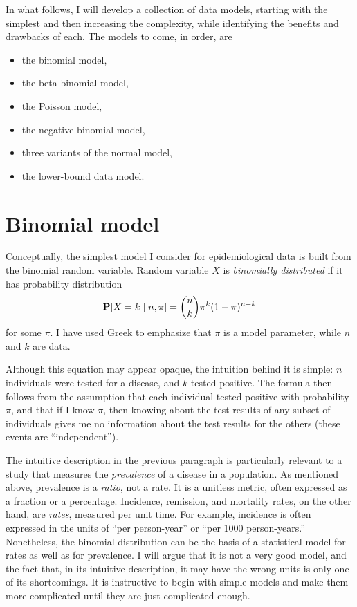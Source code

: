 In what follows, I will develop a collection of data models, starting
with the simplest and then increasing the complexity, while
identifying the benefits and drawbacks of each.  The models to come,
in order, are
\begin{itemize}
\item the binomial model,
\item the beta-binomial model,
\item the Poisson model,
\item the negative-binomial model,
\item three variants of the normal model,
\item the lower-bound data model.
\end{itemize}

\section{Binomial model}
Conceptually, the simplest model I consider for epidemiological data
is built from the binomial random variable. Random variable $X$ is
\emph{binomially distributed} if it has probability distribution
\[
\mathbf{P}[X=k\;|\; n, \pi] = \binom{n}{k}\pi^k(1-\pi)^{n-k}
\]
for some $\pi$.  I have used Greek to emphasize that $\pi$ is a model
parameter, while $n$ and $k$ are data.

Although this equation may appear opaque, the intuition behind it is
simple: $n$ individuals were tested for a disease, and $k$ tested
positive. The formula then follows from the assumption that each
individual tested positive with probability $\pi$, and that if I know
$\pi$, then knowing about the test results of any subset of
individuals gives me no information about the test results for the
others (these events are ``independent'').

The intuitive description in the previous paragraph is particularly
relevant to a study that measures the \emph{prevalence} of a disease
in a population.  As mentioned above, prevalence is a \emph{ratio}, not
a rate.  It is a unitless metric, often expressed as a fraction or a
percentage.  Incidence, remission, and mortality rates, on the other
hand, are \emph{rates}, measured per unit time.  For example,
incidence is often expressed in the units of ``per person-year'' or
``per 1000 person-years.''  Nonetheless, the binomial distribution can
be the basis of a statistical model for rates as well as for
prevalence.  I will argue that it is not a very good model, and the
fact that, in its intuitive description, it may have the wrong units is
only one of its shortcomings.  It is instructive to
begin with simple models and make them more complicated until they
are just complicated enough.

